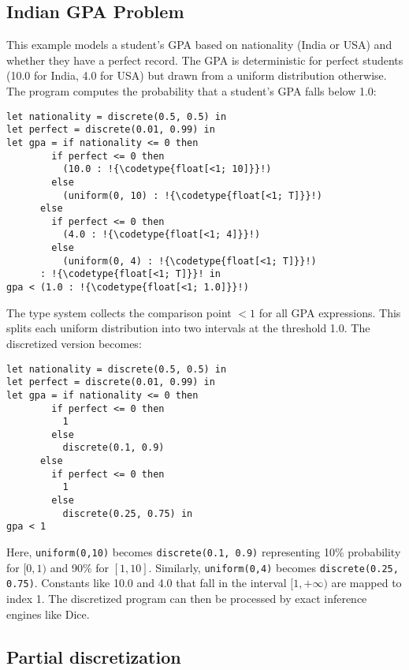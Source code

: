 \documentclass[acmsmall,screen,dvipsnames,x11names,nonacm,anonymous,review]{acmart}
\newcommand{\codetype}[1]{\textcolor{typecolor}{\ttfamily\small#1}}
\begin{document}
\subsection{Indian GPA Problem}\label{sec:gpa}

This example models a student's GPA based on nationality (India or USA) and whether they have a perfect record. The GPA is deterministic for perfect students (10.0 for India, 4.0 for USA) but drawn from a uniform distribution otherwise. The program computes the probability that a student's GPA falls below 1.0:

\begin{lstlisting}[aboveskip=1em,belowskip=1em,escapechar=!]
let nationality = discrete(0.5, 0.5) in
let perfect = discrete(0.01, 0.99) in
let gpa = if nationality <= 0 then
        if perfect <= 0 then
          (10.0 : !{\codetype{float[<1; 10]}}!)
        else
          (uniform(0, 10) : !{\codetype{float[<1; T]}}!)
      else
        if perfect <= 0 then
          (4.0 : !{\codetype{float[<1; 4]}}!)
        else
          (uniform(0, 4) : !{\codetype{float[<1; T]}}!)
      : !{\codetype{float[<1; T]}}! in
gpa < (1.0 : !{\codetype{float[<1; 1.0]}}!)
\end{lstlisting}

\noindent The type system collects the comparison point $<1$ for all GPA expressions. This splits each uniform distribution into two intervals at the threshold 1.0. The discretized version becomes:

\begin{lstlisting}[aboveskip=1em,belowskip=1em]
let nationality = discrete(0.5, 0.5) in
let perfect = discrete(0.01, 0.99) in
let gpa = if nationality <= 0 then
        if perfect <= 0 then
          1
        else
          discrete(0.1, 0.9)
      else
        if perfect <= 0 then
          1
        else
          discrete(0.25, 0.75) in
gpa < 1
\end{lstlisting}

\noindent Here, \texttt{uniform(0,10)} becomes \texttt{discrete(0.1, 0.9)} representing 10\% probability for $[0,1)$ and 90\% for $[1,10]$. Similarly, \texttt{uniform(0,4)} becomes \texttt{discrete(0.25, 0.75)}. Constants like 10.0 and 4.0 that fall in the interval $[1,+\infty)$ are mapped to index 1. The discretized program can then be processed by exact inference engines like Dice.

\subsection{Partial discretization}
\end{document}
